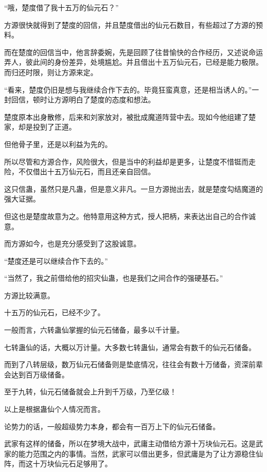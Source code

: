 
\begin{this_body}



“哦，楚度借了我十五万的仙元石？”

方源很快就得到了楚度的回信，并且楚度借出的仙元石数目，有些超过了方源的预料。

而在楚度的回信当中，他言辞委婉，先是回顾了往昔愉快的合作经历，又述说命运弄人，彼此间的身份差异，处境尴尬。并且借出十五万仙元石，已经是能力极限。而归还时限，则让方源来定。

“看来，楚度仍旧是想与我继续合作下去的。毕竟狂蛮真意，还是相当诱人的。”一封回信，顿时让方源明白了楚度的态度和想法。

楚度原本出身散修，后来和刘家放对，被批成魔道阵营中去。现如今他组建了楚家，却是投到了正道。

但他骨子里，还是以利益为先的。

所以尽管和方源合作，风险很大，但是当中的利益却是更多，让楚度不惜铤而走险，不仅借出十五万仙元石，而且还亲自回信。

这只信蛊，虽然只是凡蛊，但是意义非凡。一旦方源抛出去，就是楚度勾结魔道的强大证据。

但这也是楚度故意为之。他特意用这种方式，授人把柄，来表达出自己的合作诚意。

而方源如今，也是充分感受到了这股诚意。

“楚度还是可以继续合作下去的。”

“当然了，我之前借给他的招灾仙蛊，也是我们之间合作的强硬基石。”

方源比较满意。

十五万的仙元石，已经不少了。

一般而言，六转蛊仙掌握的仙元石储备，最多以千计量。

七转蛊仙的话，大概以万计量。大多数七转蛊仙，通常会有数千的仙元石储备。

而到了八转层级，数万仙元石储备则是垫底情况，往往会有数十万储备，资深前辈会达到百万级储备。

至于九转，仙元石储备就会上升到千万级，乃至亿级！

以上是根据蛊仙个人情况而言。

论势力的话，一般超级势力本身，都会有一百万上下的仙元石储备。

武家有这样的储备，所以在梦境大战中，武庸主动借给方源十万块仙元石。这是武家的能力范围之内的事情。当然，武家可以借出更多，但武庸是为了让方源稳住仙阵，而这十万块仙元石足够用了。


\end{this_body}
